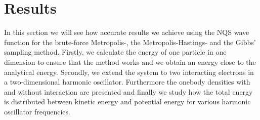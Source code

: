 \documentclass[norsk,a4paper,12pt]{article}
\begin{document}
\section{Results} \label{sec:Results}
In this section we will see how accurate results we achieve using the NQS wave function for the brute-force Metropolis-, the Metropolis-Hastings- and the Gibbs' sampling method. Firstly, we calculate the energy of one particle in one dimension to ensure that the method works and we obtain an energy close to the analytical energy. Secondly, we extend the system to two interacting electrons in a two-dimensional harmonic oscillator. Furthermore the onebody densities with and without interaction are presented and finally we study how the total energy is distributed between kinetic energy and potential energy for various harmonic oscillator frequencies. 
\end{document}
